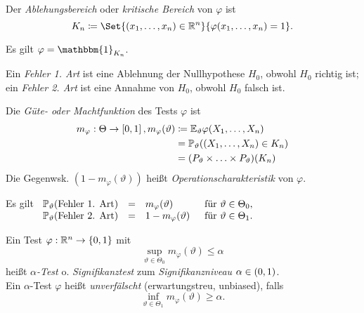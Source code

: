 \documentclass{cheat-sheet}
\renewcommand{\P}{\mathbb{P}} %
\newcommand{\E}{\mathbb{E}} %
\newcommand{\ind}{\mathbbm{1}} %
\begin{document}
\begin{defn}
  Der \emph{Ablehungsbereich} oder \emph{kritische Bereich} von $\varphi$ ist
  \[ K_n \coloneqq \Set{(x_1, \ldots, x_n) \in \R^n}{\varphi(x_1, \ldots, x_n) = 1}. \]
\end{defn}

\begin{bem}
  Es gilt $\varphi = \ind_{K_n}$.
\end{bem}

\begin{defn}
  Ein \emph{Fehler 1. Art} ist eine Ablehnung der Nullhypothese $H_0$, obwohl $H_0$ richtig ist;
  ein \emph{Fehler 2. Art} ist eine Annahme von $H_0$, obwohl $H_0$ falsch ist.
\end{defn}


\begin{defn}
  Die \emph{Güte- oder Machtfunktion} des Tests $\varphi$ ist
  \begin{align*}
    m_\varphi : \Theta \to \cinterval{0}{1},
    m_\varphi(\vartheta) & \coloneqq
    \E_\vartheta \varphi(X_1, \ldots, X_n) \\
    & = \P_\vartheta ((X_1, \ldots, X_n) \in K_n) \\
    & = (P_\vartheta \times \ldots \times P_\vartheta)(K_n)
  \end{align*}
  Die Gegenwsk. $(1 {-} m_\varphi(\vartheta))$ heißt \emph{Operationscharakteristik} von $\varphi$.
\end{defn}

\begin{bem}
  Es gilt \enspace
  $\begin{array}[t]{r c l l}
    \P_\vartheta(\text{Fehler 1. Art}) &=& m_\varphi(\vartheta) & \enspace\text{für $\vartheta \in \Theta_0$,} \\
    \P_\vartheta(\text{Fehler 2. Art}) &=& 1 - m_\varphi(\vartheta) & \enspace\text{für $\vartheta \in \Theta_1$.}
  \end{array}$
\end{bem}


\begin{defn}
  Ein Test $\varphi : \mathbb{R}^n \to \{ 0, 1 \}$ mit
  \[ \sup_{\vartheta \in \Theta_0} m_\varphi(\vartheta) \leq \alpha \]
  heißt \emph{$\alpha$-Test} o. \emph{Signifikanztest} zum \emph{Signifikanzniveau} $\alpha \in \left( 0, 1 \right)$. \\[2pt]
  Ein $\alpha$-Test $\varphi$ heißt \emph{unverfälscht} (erwartungstreu, unbiased), falls
  \[ \inf_{\vartheta \in \Theta_1} m_\varphi(\vartheta) \geq \alpha. \]
\end{defn}
\end{document}
